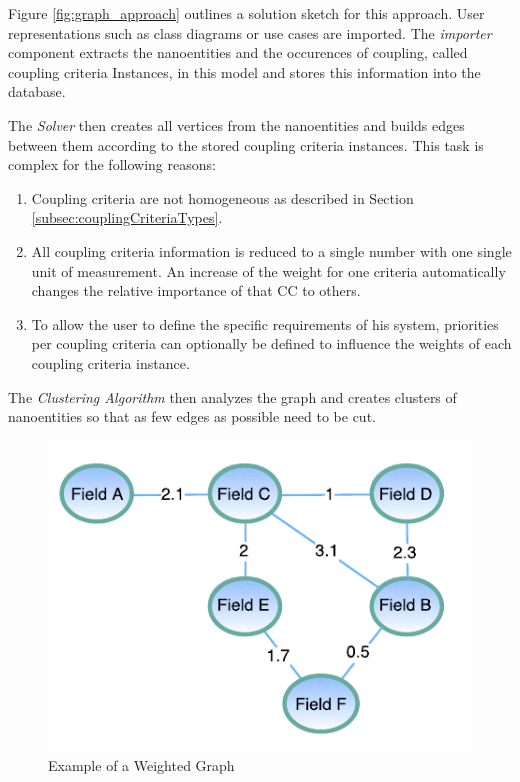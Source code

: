 \begin{minipage}[t]{0.5\textwidth}
\setlength{\parskip}{5pt plus 0.1pt}
	Figure \ref{fig:graph_approach} outlines a solution sketch for this approach. User representations such as class diagrams or use cases are imported. The \textit{importer} component extracts the nanoentities and the occurences of coupling, called coupling criteria Instances, in this model and stores this information into the database.
	
	The \textit{Solver} then creates all vertices from the nanoentities and builds edges between them according to the stored coupling criteria instances. This task is complex for the following reasons:
	
	\begin{enumerate}
		\item Coupling criteria are not homogeneous as described in Section \ref{subsec:couplingCriteriaTypes}. 
		
		\item All coupling criteria information is reduced to a single number with one single unit of measurement. An increase of the weight for one criteria automatically changes the relative importance of that CC to others.
		
		\item To allow the user to define the specific requirements of his system, priorities per coupling criteria can optionally be defined to influence the weights of each coupling criteria instance.
	\end{enumerate}
	
	The \textit{Clustering Algorithm} then analyzes the graph and creates clusters of nanoentities so that as few edges as possible need to be cut.
	
	\begin{figure}[H]
		\includegraphics[scale=1.0]{diagrams/weighted_graph.pdf}
		\caption{Example of a Weighted Graph}
		\label{fig:weighted_graph}
	\end{figure}

\end{minipage}
